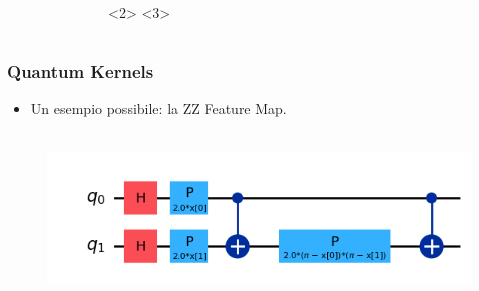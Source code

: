 \documentclass{beamer}
\begin{document}
\begin{frame}
\begin{columns}
{\begin{figure}
 \end{figure}}<2>
     <3>


    
    \end{columns}

\end{frame}


\begin{frame}
  \frametitle{Quantum Kernels}
  
  \begin{itemize}
    \item Un esempio possibile: la ZZ Feature Map. \\\,
  \end{itemize}
     
        \begin{figure}
          \includegraphics[width=\textwidth]{images/ZZ.png}
        \end{figure}
        
\end{frame}
\end{document}
